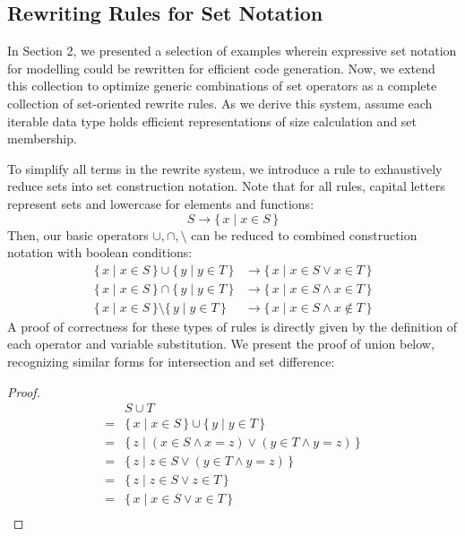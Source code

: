 \documentclass{article}
\newcommand{\Set}[2]{%
  \{\, #1 \mid #2 \, \}%
}
\begin{document}
\subsection{Rewriting Rules for Set Notation}

In Section 2, we presented a selection of examples wherein expressive set notation for modelling could be rewritten for efficient code generation. Now, we extend this collection to optimize generic combinations of set operators as a complete collection of set-oriented rewrite rules. As we derive this system, assume each iterable data type holds efficient representations of size calculation and set membership.



To simplify all terms in the rewrite system, we introduce a rule to exhaustively reduce sets into set construction notation. Note that for all rules, capital letters represent sets and lowercase for elements and functions:
\begin{equation}
S \rightarrow \Set{x}{x \in S}
\end{equation}
Then, our basic operators $\cup, \cap, \setminus$ can be reduced to combined construction notation with boolean conditions:
\begin{align}
  \Set{x}{x \in S} \cup \Set{y}{y \in T} &\rightarrow \Set{x}{x \in S \lor x \in T}\\
  \Set{x}{x \in S} \cap \Set{y}{y \in T} &\rightarrow \Set{x}{x \in S \land x \in T}\\
  \Set{x}{x \in S} \setminus \Set{y}{y \in T} &\rightarrow \Set{x}{x \in S \land x \notin T}
\end{align}
A proof of correctness for these types of rules is directly given by the definition of each operator and variable substitution. We present the proof of union below, recognizing similar forms for intersection and set difference:
\begin{proof}
  \begin{align*}
    &S \cup T\\
    =&\Set{x}{x \in S} \cup \Set{y}{y \in T}\\
    =&\Set{z}{(x \in S \land x = z) \lor (y \in T \land y = z)}\\
    =&\Set{z}{z \in S \lor (y \in T \land y = z)}\\
    =&\Set{z}{z \in S \lor z \in T}\\
    =&\Set{x}{x \in S \lor x \in T}\\
  \end{align*}
\end{proof}
\end{document}
